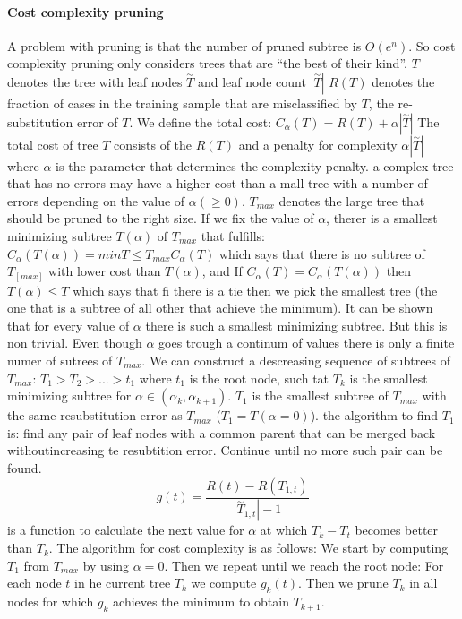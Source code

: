 \documentclass[8pt,landscape]{extarticle}
\begin{document}
\begin{multicols}{3}
\paragraph{Cost complexity pruning}
A problem with pruning is that the number of pruned subtree is $O(e^n)$.
So cost complexity pruning only considers trees that are
``the best of their kind''.
$T$ denotes the tree with leaf nodes $\overset{\sim}{T}$  and leaf node count
$|\overset{\sim}{T}|$
$R(T)$ denotes the fraction of cases in the training sample that are
misclassified by $T$, the re-substitution error of $T$.
We define the total cost: $C_\alpha(T)=R(T)+\alpha |\overset{\sim}{T}|$
The total cost of tree $T$ consists of the $R(T)$ and a penalty for complexity
$\alpha|\overset{\sim}{T}|$ where $\alpha$ is the parameter that determines the
complexity penalty.
a complex tree that has no errors may have a higher cost than a mall tree with
a number of errors depending on the value of $\alpha (\geq 0)$.
$T_{max}$ denotes the large tree that should be pruned to the right size.
If we fix the value of $\alpha$, therer is a smallest minimizing subtree $T(\alpha)$
of $T_{max}$ that fulfills:
$C_\alpha(T(\alpha))=min T \leq T_{max} C_\alpha(T)$ which says that there is no
subtree of $T_[max]$ with lower cost than $T(\alpha)$, and
If $C_\alpha (T) = C_\alpha(T(\alpha))$ then $T(\alpha) \leq T$ which says that
fi there is a tie then we pick the smallest tree (the one that is a subtree of
all other that achieve the minimum).
It can be shown that for every value of $\alpha$ there is  such a smallest
minimizing subtree. But this is non trivial.
Even though $\alpha$ goes trough a continum of values there is only a finite
numer of sutrees of $T_{max}$. We can construct a descreasing sequence of
subtrees of $T_{max}$: $T_1 > T_2 > ... > {t_1} $ where $t_1$ is the root node,
such tat $T_k$ is the smallest minimizing subtree for
$\alpha \in (\alpha_k, \alpha_{k+1})$. $T_1$ is the smallest subtree of $T_{max}$
with the same resubstitution error as $T_{max}$ ($T_1=T(\alpha=0)$).
the algorithm to find $T_1$ is: find any pair of leaf nodes with a common parent
that can be merged back withoutincreasing te resubtition error. Continue until
no more such pair can be found.
\[g(t)=\frac{R(t)-R(T_{1,t})}{|\overset{\sim}{T}_{1,t}|-1}\]
is a function to calculate the next value for $\alpha$ at which $T_k - T_t$
becomes better than $T_k$.
The algorithm for cost complexity is as follows: We start by computing $T_1$ from $T_{max}$
by using $\alpha = 0$. Then we repeat until we reach the root node:
For each node $t$ in he current tree $T_k$ we compute $g_k(t)$. Then we prune
$T_k$ in all nodes for which $g_k$ achieves the minimum to obtain $T_{k+1}$.

\end{multicols}
\end{document}
